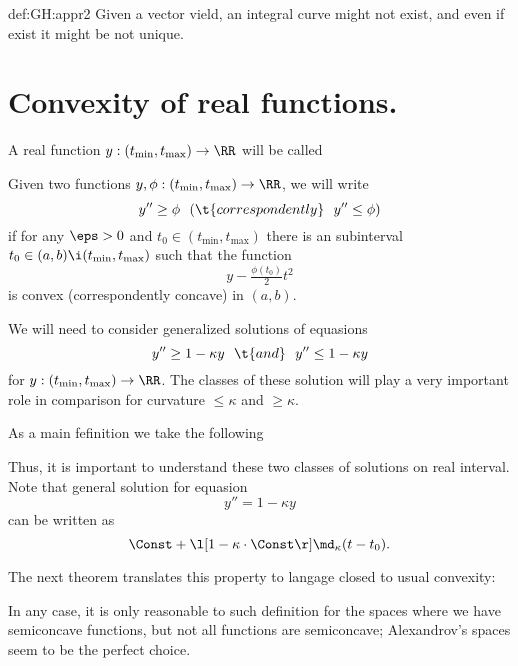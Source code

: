 {\begin{subthm}{def:GH:appr2}
Given a vector vield, an integral curve might not exist, and even if exist it might be not unique.



























\section{Convexity of real functions.}

A real function $y:(t_{\min},t_{\max})\to\RR$ will be called


Given two functions $y,\phi:(t_{\min},t_{\max})\to\RR$, we will write
$$y''\ge \phi\ \ (\t{correspondently}\ \ y''\le \phi)$$
if for any $\eps>0$ and $t_0\in(t_{\min},t_{\max})$ there is an subinterval $t_0\in(a,b)\i (t_{\min},t_{\max})$
such that the function
$$y-\tfrac{\phi(t_0)}2t^2$$
is convex (correspondently concave) in $(a,b)$. 

We will need to consider generalized solutions of equasions 
$$y''\ge 1-\kappa y\ \  \t{and}\ \  y''\le 1-\kappa y$$
for $y:(t_{\min},t_{\max})\to\RR$.
The classes of these solution will play a very important role in comparison for curvature $\le\kappa$ and $\ge\kappa$.


As a main fefinition we take the following

Thus, it is important to understand these two classes of  solutions on real interval. 
Note that general solution for equasion
$$y''=1-\kappa y$$ 
 can be written as
$$\Const+\l[1-\kappa \cdot \Const\r]\md_\kappa(t-t_0).$$

The next theorem translates this property to langage closed to usual convexity: 













In any case, it is only reasonable to such definition for the spaces where we have semiconcave functions, but not all
functions are semiconcave;
Alexandrov's spaces seem to be the perfect choice.














\end{subthm}}
